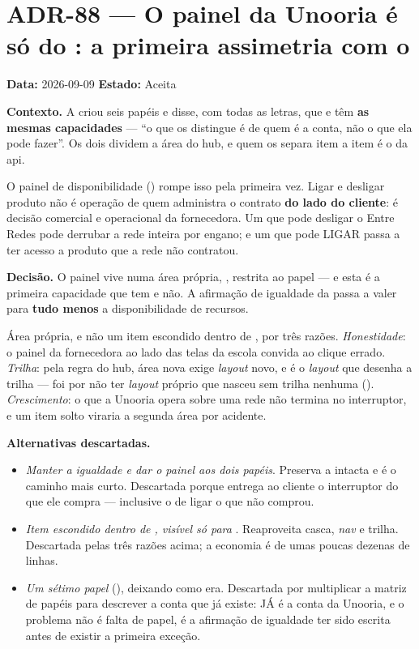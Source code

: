 \section{ADR-88 --- O painel da Unooria é só do : a primeira
assimetria com o }

\textbf{Data:} 2026-09-09 \quad \textbf{Estado:} Aceita

\textbf{Contexto.} A  criou seis papéis e disse, com todas as
letras, que  e  têm \textbf{as mesmas
capacidades} --- \enquote{o que os distingue é de quem é a conta, não o que ela
pode fazer}. Os dois dividem a área  do hub, e quem os separa item a
item é o  da api.

O painel de disponibilidade () rompe isso pela primeira vez. Ligar
e desligar produto não é operação de quem administra o contrato \textbf{do lado
do cliente}: é decisão comercial e operacional da fornecedora. Um
 que pode desligar o Entre Redes pode derrubar a rede
inteira por engano; e um que pode LIGAR passa a ter acesso a produto que a rede
não contratou.

\textbf{Decisão.} O painel vive numa área própria, , restrita ao
papel  --- e esta é a primeira capacidade que  tem e
 não. A afirmação de igualdade da  passa a
valer para \textbf{tudo menos} a disponibilidade de recursos.

Área própria, e não um item escondido dentro de , por três razões.
\emph{Honestidade}: o painel da fornecedora ao lado das telas da escola convida
ao clique errado. \emph{Trilha}: pela regra do hub, área nova exige
\emph{layout} novo, e é o \emph{layout} que desenha a trilha --- foi por não ter
\emph{layout} próprio que  nasceu sem trilha nenhuma ().
\emph{Crescimento}: o que a Unooria opera sobre uma rede não termina no
interruptor, e um item solto viraria a segunda área por acidente.

\textbf{Alternativas descartadas.}
\begin{itemize}
  \item \emph{Manter a igualdade e dar o painel aos dois papéis}. Preserva a
     intacta e é o caminho mais curto. Descartada porque entrega ao
    cliente o interruptor do que ele compra --- inclusive o de ligar o que não
    comprou.
  \item \emph{Item escondido dentro de , visível só para
    }. Reaproveita casca, \emph{nav} e trilha. Descartada pelas três
    razões acima; a economia é de umas poucas dezenas de linhas.
  \item \emph{Um sétimo papel} (), deixando 
    como era. Descartada por multiplicar a matriz de papéis para descrever a
    conta que já existe:  JÁ é a conta da Unooria, e o problema não é
    falta de papel, é a afirmação de igualdade ter sido escrita antes de existir
    a primeira exceção.
\end{itemize}

